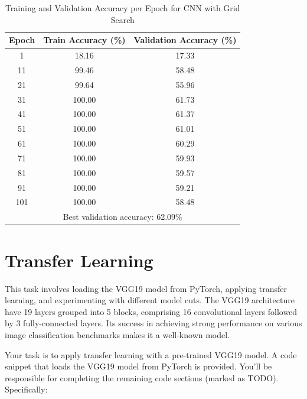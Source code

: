 \documentclass[11pt]{scrartcl}
\begin{document}
\begin{table}[htbp]
\centering
\caption{Training and Validation Accuracy per Epoch for CNN with Grid Search}
\begin{tabular}{ccc}
\toprule
\textbf{Epoch} & \textbf{Train Accuracy (\%)} & \textbf{Validation Accuracy (\%)} \\
\midrule
1    & 18.16  & 17.33  \\
11   & 99.46  & 58.48  \\
21   & 99.64  & 55.96  \\
31   & 100.00 & 61.73  \\
41   & 100.00 & 61.37  \\
51   & 100.00 & 61.01  \\
61   & 100.00 & 60.29  \\
71   & 100.00 & 59.93  \\
81   & 100.00 & 59.57  \\
91   & 100.00 & 59.21  \\
101  & 100.00 & 58.48  \\
\midrule
\multicolumn{3}{c}{Best validation accuracy: 62.09\%} \\
\bottomrule
\end{tabular}
\label{tab:task2-bonus-accuracy}
\end{table}


\newpage
\section{Transfer Learning}

This task involves loading the VGG19 model from PyTorch, 
applying transfer learning, and experimenting with different model cuts. 
The VGG19 architecture have 19 layers grouped into 5 blocks, 
comprising 16 convolutional layers followed by 3 fully-connected layers. 
Its success in achieving strong performance on various image classification benchmarks 
makes it a well-known model.

Your task is to apply transfer learning with a pre-trained VGG19 model. 
A code snippet that loads the VGG19 model from PyTorch is provided. 
You'll be responsible for completing the remaining code sections (marked as TODO). 
Specifically:
\end{document}
